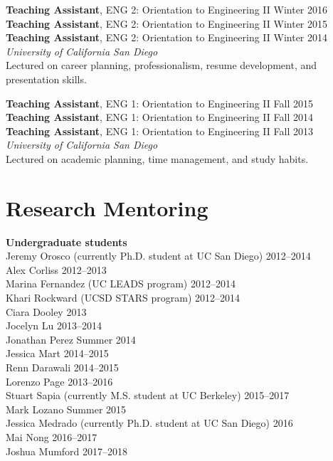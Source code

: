 \documentclass[10pt]{res}
\begin{document}
\begin{resume}
\textbf{Teaching Assistant}, ENG 2: Orientation to Engineering II \hfill Winter 2016 \\
\textbf{Teaching Assistant}, ENG 2: Orientation to Engineering II \hfill Winter 2015 \\
\textbf{Teaching Assistant}, ENG 2: Orientation to Engineering II \hfill Winter 2014 \\
\textit{University of California San Diego} \\
Lectured on career planning, professionalism, resume development, and presentation skills.

\textbf{Teaching Assistant}, ENG 1: Orientation to Engineering II \hfill Fall 2015 \\
\textbf{Teaching Assistant}, ENG 1: Orientation to Engineering II \hfill Fall 2014 \\
\textbf{Teaching Assistant}, ENG 1: Orientation to Engineering II \hfill Fall 2013 \\
\textit{University of California San Diego} \\
Lectured on academic planning, time management, and study habits.



\section{Research Mentoring}
\vspace{0.1in}

\textbf{Undergraduate students} \\
Jeremy Orosco (currently Ph.D. student at UC San Diego) \hfill 2012--2014 \\
Alex Corliss \hfill 2012--2013 \\
Marina Fernandez (UC LEADS program) \hfill 2012--2014 \\
Khari Rockward (UCSD STARS program) \hfill 2012--2014 \\
Ciara Dooley \hfill 2013 \\
Jocelyn Lu \hfill 2013--2014 \\
Jonathan Perez \hfill Summer 2014 \\
Jessica Mart \hfill 2014--2015 \\
Renn Darawali \hfill 2014--2015 \\
Lorenzo Page \hfill 2013--2016 \\
Stuart Sapia (currently M.S. student at UC Berkeley) \hfill 2015--2017 \\
Mark Lozano \hfill Summer 2015 \\
Jessica Medrado (currently Ph.D. student at UC San Diego) \hfill 2016 \\
Mai Nong \hfill 2016--2017 \\
Joshua Mumford \hfill 2017--2018



\end{resume}
\end{document}
